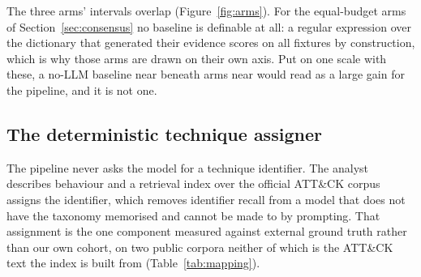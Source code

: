 The three arms' intervals overlap (Figure~\ref{fig:arms}). For the equal-budget arms of
Section~\ref{sec:consensus} no baseline is definable at all: a regular expression over the
dictionary that generated their evidence scores  on all
 fixtures by construction, which is why those arms are drawn on their own
axis. Put on one scale with these, a no-LLM baseline near  beneath arms near
 would read as a large gain for the pipeline, and it is not one.

\subsection{The deterministic technique assigner}\label{sec:assignment}

The pipeline never asks the model for a technique identifier. The analyst describes behaviour and a
retrieval index over the official ATT\&CK corpus assigns the identifier, which removes identifier
recall from a model that does not have the taxonomy memorised and cannot be made to by prompting. That assignment is the one component measured against external ground truth rather than our own
cohort, on two public corpora neither of which is the ATT\&CK text the index is built from
(Table~\ref{tab:mapping}).

